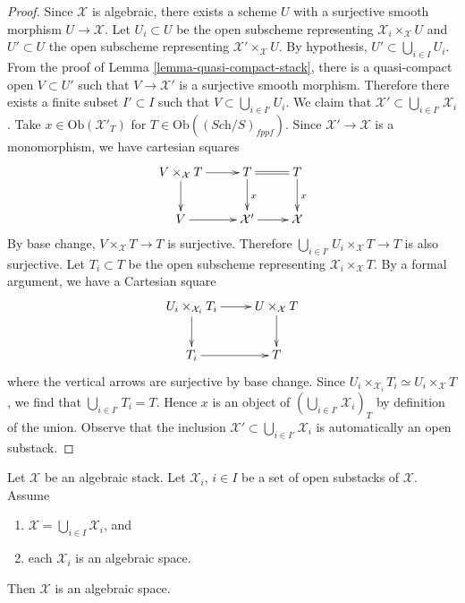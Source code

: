 \begin{proof}
Since $\mathcal X$ is algebraic, there exists a scheme $U$ with a surjective
smooth morphism $U \to \mathcal X$. Let $U_i \subset U$ be the open subscheme
representing $\mathcal{X}_i \times_{\mathcal X} U$ and $U' \subset U$ the
open subscheme representing $\mathcal{X}' \times_{\mathcal X} U$. By
hypothesis, $U'\subset \bigcup_{i\in I} U_i$. From the proof of
Lemma \ref{lemma-quasi-compact-stack},
there is a quasi-compact open $V \subset U'$ such that $V \to \mathcal{X}'$
is a surjective smooth morphism. Therefore there exists a finite subset
$I' \subset I$ such that $V \subset \bigcup_{i \in I'}
U_i$. We claim that $\mathcal{X}' \subset \bigcup_{i \in I'} \mathcal{X}_i$. 
Take $x \in \text{Ob}(\mathcal{X}'_T)$ for
$T \in \text{Ob}((\textit{Sch}/S)_{fppf})$. 
Since $\mathcal{X}' \to \mathcal{X}$ is a monomorphism, we have cartesian
squares
$$
\xymatrix{
V \times_{\mathcal{X}} T \ar[r] \ar[d] &
T \ar[d]^x \ar@{=}[r] &
T \ar[d]^x \\
V \ar[r] &
\mathcal{X}' \ar[r] &
\mathcal X
}
$$
By base change, $V \times_{\mathcal X} T \to T$ is surjective. Therefore 
$\bigcup_{i \in I'} U_i \times_{\mathcal X} T \to T$ is also surjective. 
Let $T_i \subset T$ be the open subscheme representing
$\mathcal{X}_i \times_{\mathcal X} T$. 
By a formal argument, we have a Cartesian square
$$
\xymatrix{
U_i \times_{\mathcal{X}_i} T_i \ar[r] \ar[d] &
U \times_{\mathcal X} T \ar[d] \\
T_i \ar[r] & T
}
$$
where the vertical arrows are surjective by base change. Since 
$U_i \times_{\mathcal{X}_i} T_i \simeq U_i \times_{\mathcal X} T$,
we find that $\bigcup_{i \in I'} T_i = T$. Hence
$x$ is an object of $(\bigcup_{i\in I'} \mathcal{X}_i)_T$ by
definition of the union. Observe that the inclusion
$\mathcal{X}' \subset \bigcup_{i \in I'} \mathcal{X}_i$
is automatically an open substack.
\end{proof}

\begin{lemma}
\label{lemma-zariski-open-cover-stack-is-space}
Let $\mathcal X$ be an algebraic stack.
Let $\mathcal{X}_i$, $i \in I$ be a set of open substacks of $\mathcal{X}$.
Assume
\begin{enumerate}
\item $\mathcal{X} = \bigcup_{i \in I} \mathcal{X}_i$, and
\item each $\mathcal{X}_i$ is an algebraic space.
\end{enumerate}
Then $\mathcal{X}$ is an algebraic space.
\end{lemma} 


